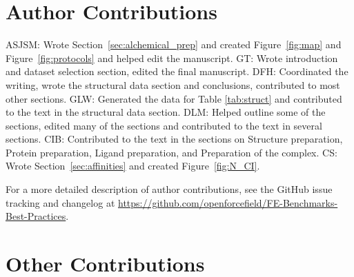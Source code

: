 \documentclass[9pt,bestpractices]{livecoms}
\newcommand{\githubrepository}{\url{https://github.com/openforcefield/FE-Benchmarks-Best-Practices}}  %
\begin{document}
\begin{Checklists*}
\end{Checklists*}




\section{Author Contributions}
%

ASJSM: Wrote Section~\ref{sec:alchemical_prep} and created Figure~\ref{fig:map} and Figure~\ref{fig:protocols} and helped edit the manuscript. 
GT: Wrote introduction and dataset selection section, edited the final manuscript.
DFH: Coordinated the writing, wrote the structural data section and conclusions, contributed to most other sections.
GLW: Generated the data for Table \ref{tab:struct} and contributed to the text in the structural data section.
DLM: Helped outline some of the sections, edited many of the sections and contributed to the text in several sections.
CIB: Contributed to the text in the sections on Structure preparation, Protein preparation, Ligand preparation, and Preparation of the complex.
CS: Wrote Section~\ref{sec:affinities} and created Figure~\ref{fig:N_CI}.

For a more detailed description of author contributions,
see the GitHub issue tracking and changelog at \githubrepository.


\section{Other Contributions}
%
\end{document}
